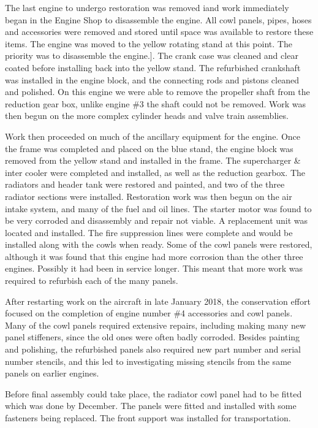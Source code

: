 The last engine to undergo restoration was removed iand work
immediately began in the Engine Shop to disassemble the engine.  All cowl
panels, pipes, hoses and accessories were removed and stored until space was
available to restore these items. The engine was moved to the yellow rotating
stand at this point. The priority was to disassemble the engine.]. The crank
case was cleaned and clear coated before installing back into the yellow stand.
The refurbished crankshaft was installed in the engine block, and the connecting
rods and pistons cleaned and polished. On this engine we were able to remove the
propeller shaft from the reduction gear box, unlike engine \#3 the shaft could
not be removed.  Work was then begun on the more complex cylinder heads and
valve train assemblies.

Work then proceeded on much of the ancillary equipment for the engine. Once the
frame was completed and placed on the blue stand, the engine block was removed
from the yellow stand and installed in the frame. The supercharger \& inter
cooler were completed and installed, as well as the reduction gearbox. The
radiators and header tank were restored and painted, and two of the three
radiator sections were installed. Restoration work was then begun on the air
intake system, and many of the fuel and oil lines.  The starter motor was found
to be very corroded and disassembly and repair not viable. A replacement unit
was located and installed. The fire suppression lines were complete and would be
installed along with the cowls when ready. Some of the cowl panels were
restored, although it was found that this engine had more corrosion than the
other three engines. Possibly it had been in service longer.  This meant that
more work was required to refurbish each of the many panels.

After restarting work on the aircraft in late January 2018, the conservation
effort focused on the completion of engine number \#4 accessories and cowl
panels.   Many of the cowl panels required extensive repairs, including making
many new panel stiffeners, since the old ones were often badly corroded.
Besides painting and polishing, the refurbished panels also required new part
number and serial number stencils, and this led to investigating missing
stencils from the same panels on earlier engines.  

Before final assembly could take place, the radiator cowl panel had to be fitted
which was done by December. The panels were fitted and installed with some
fasteners being replaced. The front support was installed for transportation.

